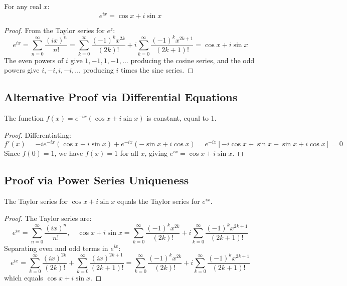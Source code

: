 \begin{theorem}
For any real $x$:
\[
e^{ix} = \cos x + i \sin x
\]
\end{theorem}

\begin{proof}
From the Taylor series for $e^z$:
\[
e^{ix} = \sum_{n=0}^\infty \frac{(ix)^n}{n!}
= \sum_{k=0}^\infty \frac{(-1)^k x^{2k}}{(2k)!} + i \sum_{k=0}^\infty \frac{(-1)^k x^{2k+1}}{(2k+1)!}
= \cos x + i \sin x
\]
The even powers of $i$ give $1, -1, 1, -1, \ldots$ producing the cosine series, and the odd
powers give $i, -i, i, -i, \ldots$ producing $i$ times the sine series.
\end{proof}

\subsection{Alternative Proof via Differential Equations}

\begin{theorem}
The function $f(x) = e^{-ix}(\cos x + i\sin x)$ is constant, equal to 1.
\end{theorem}

\begin{proof}
Differentiating:
\[
f'(x) = -ie^{-ix}(\cos x + i\sin x) + e^{-ix}(-\sin x + i\cos x)
= e^{-ix}[-i\cos x + \sin x - \sin x + i\cos x] = 0
\]
Since $f(0) = 1$, we have $f(x) = 1$ for all $x$, giving $e^{ix} = \cos x + i\sin x$.
\end{proof}

\subsection{Proof via Power Series Uniqueness}

\begin{theorem}
The Taylor series for $\cos x + i\sin x$ equals the Taylor series for $e^{ix}$.
\end{theorem}

\begin{proof}
The Taylor series are:
\[
e^{ix} = \sum_{n=0}^\infty \frac{(ix)^n}{n!}, \quad \cos x + i\sin x = \sum_{k=0}^\infty \frac{(-1)^k x^{2k}}{(2k)!} + i\sum_{k=0}^\infty \frac{(-1)^k x^{2k+1}}{(2k+1)!}
\]
Separating even and odd terms in $e^{ix}$:
\[
e^{ix} = \sum_{k=0}^\infty \frac{(ix)^{2k}}{(2k)!} + \sum_{k=0}^\infty \frac{(ix)^{2k+1}}{(2k+1)!}
= \sum_{k=0}^\infty \frac{(-1)^k x^{2k}}{(2k)!} + i\sum_{k=0}^\infty \frac{(-1)^k x^{2k+1}}{(2k+1)!}
\]
which equals $\cos x + i\sin x$.
\end{proof}

